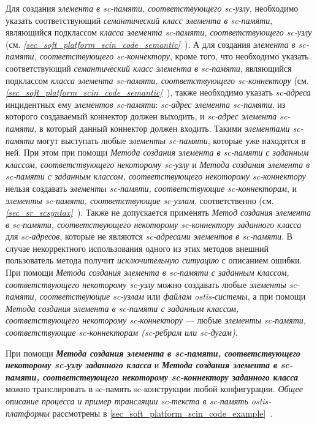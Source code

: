 Для создания \textit{элемента в sc-памяти, соответствующего sc-узлу}, необходимо указать соответствующий \textit{семантический класс элемента в sc-памяти\scnsupergroupsign}, являющийся подклассом \textit{класса элемента sc-памяти, соответствующего sc-узлу\scnsupergroupsign} (см. \textit{\ref{sec_soft_platform_scin_code_semantic}~}). А для создания \textit{элемента в sc-памяти, соответствующего sc-коннектору}, кроме того, что необходимо указать соответствующий \textit{семантический класс элемента в sc-памяти\scnsupergroupsign}, являющийся подклассом \textit{класса элемента sc-памяти, соответствующего sc-коннектору\scnsupergroupsign} (см. \textit{\ref{sec_soft_platform_scin_code_semantic}~}), также необходимо указать \textit{sc-адреса} инцидентных ему \textit{элементов sc-памяти}: \textit{sc-адрес элемента sc-памяти}, из которого создаваемый коннектор должен выходить, и \textit{sc-адрес элемента sc-памяти}, в который данный коннектор должен входить. Такими \textit{элементами sc-памяти} могут выступать любые \textit{элементы sc-памяти}, которые уже находятся в ней. При этом при помощи \textit{Метода создания элемента в sc-памяти с заданным классом, соответствующего некоторому sc-узлу} и \textit{Метода создания элемента в sc-памяти с заданным классом, соответствующего некоторому sc-коннектору} нельзя создавать \textit{элементы sc-памяти, соответствующие sc-коннекторам}, и \textit{элементы sc-памяти, соответствующие sc-узлам}, соответственно (см. \textit{\ref{sec_sr_scsyntax}~}). Также не допускается применять \textit{Метод создания элемента в sc-памяти, соответствующего некоторому sc-коннектору заданного класса} для \textit{sc-адресов}, которые не являются \textit{sc-адресами элементов в sc-памяти}. В случае некорректного использования одного из этих методов внешний пользователь метода получит \textit{исключительную ситуацию} с описанием ошибки. При помощи \textit{Метода создания элемента в sc-памяти с заданным классом, соответствующего некоторому sc-узлу} можно создавать любые \textit{элементы sc-памяти, соответствующие sc-узлам} или \textit{файлам ostis-системы}, а при помощи \textit{Метода создания элемента в sc-памяти с заданным классом, соответствующего некоторому sc-коннектору} --- любые \textit{элементы sc-памяти, соответствующие sc-коннекторам (sc-ребрам или sc-дугам)}.

При помощи \textbf{\textit{Метода создания элемента в sc-памяти, соответствующего некоторому sc-узлу заданного класса}} и \textbf{\textit{Метода создания элемента в sc-памяти, соответствующего некоторому sc-коннектору заданного класса}} можно транслировать в sc-память sc-конструкции любой конфигурации. \textit{Общее описание процесса и пример трансляции sc-текста в sc-память ostis-платформы} рассмотрены в \ref{sec_soft_platform_scin_code_example}~.


